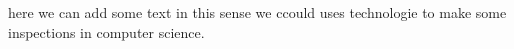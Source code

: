 here we can add some text in this sense we ccould uses technologie to make some inspections in computer science.
